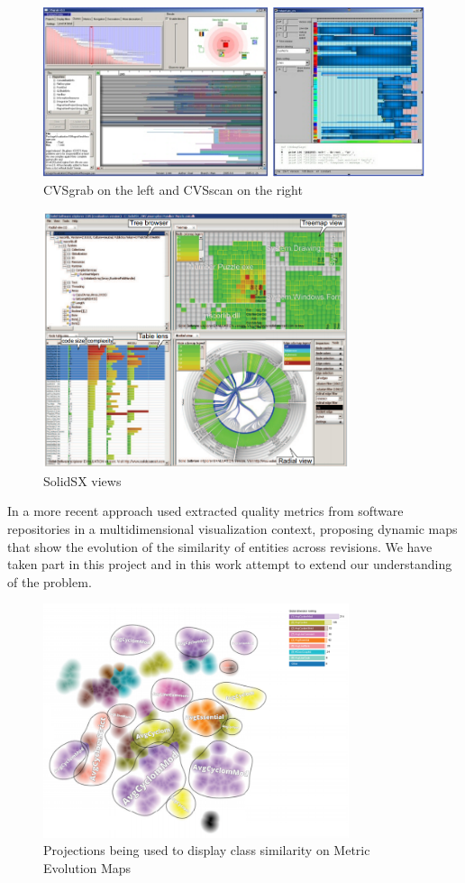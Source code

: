 \begin{figure}
 \centering
 \includegraphics[width=1.0\textwidth]{figures/cvs.png}
 \caption{CVSgrab on the left and CVSscan on the right}
 \label{fig:cvs}
\end{figure}

\begin{figure}
	\centering
	\includegraphics[width=0.8\textwidth]{figures/solidsx.png}
	\caption{SolidSX views}
	\label{fig:solidsx}
\end{figure}

In a more recent approach \citet{ref:silva2} used extracted quality metrics from software repositories in a multidimensional visualization context, proposing dynamic maps that show the evolution of the similarity of entities across revisions. We have taken part in this project and in this work attempt to extend our understanding of the problem.

\begin{figure}
	\centering
	\includegraphics[width=0.8\textwidth]{figures/mem.png}
	\caption{Projections being used to display class similarity on Metric Evolution Maps}
	\label{fig:mem}
\end{figure}
